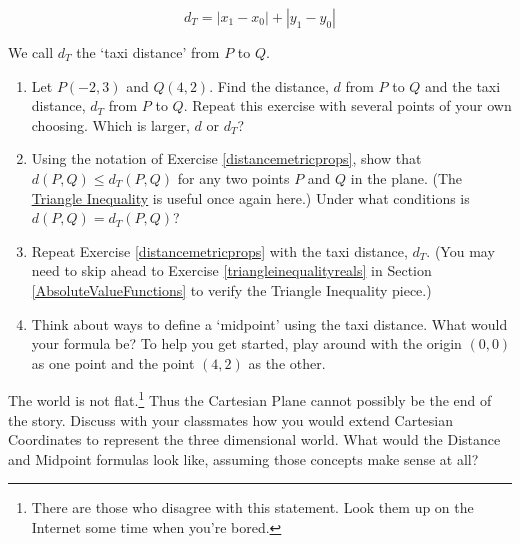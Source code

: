 \documentclass{ximera}
\begin{document}
\begin{problem}
\[ d_{T} =  \left|x_1 - x_0\right| + \left|y_1 - y_0\right| \]

We call $d_{T}$ the `taxi distance' from $P$ to $Q$.  

\begin{enumerate}

\item  Let $P(-2,3)$ and $Q(4,2)$.  Find the distance, $d$ from $P$ to $Q$ and the taxi distance, $d_{T}$ from $P$ to $Q$.  Repeat this exercise with several points of your own choosing.  Which is larger, $d$ or $d_{T}$? 

\item Using the notation of Exercise \ref{distancemetricprops}, show that $d(P,Q) \leq d_{T}(P,Q)$ for any two points $P$ and $Q$ in the plane.  (The \href{http://en.wikipedia.org/wiki/Triangle_inequality}{\underline{Triangle Inequality}} is useful once again here.)  Under what conditions is $d(P,Q) = d_{T}(P,Q)$? 
 
\item  Repeat Exercise \ref{distancemetricprops} with the taxi distance, $d_{T}$.  (You may need to skip ahead to Exercise \ref{triangleinequalityreals} in Section \ref{AbsoluteValueFunctions} to verify the Triangle Inequality piece.)

\item Think about ways to define a `midpoint' using the taxi distance.  What would your formula be?  To help you get started, play around with the origin $(0,0)$ as one point and the point $(4,2)$ as the other.

\end{enumerate}
\end{problem}

\begin{problem}\label{orderedtripleexercise}
The world is not flat.\footnote{There are those who disagree with this statement.  Look them up on the Internet some time when you're bored.}  Thus the Cartesian Plane cannot possibly be the end of the story.  Discuss with your classmates how you would extend Cartesian Coordinates to represent the three dimensional world.  What would the Distance and Midpoint formulas look like, assuming those concepts make sense at all?
\end{problem}

 
\end{document}
